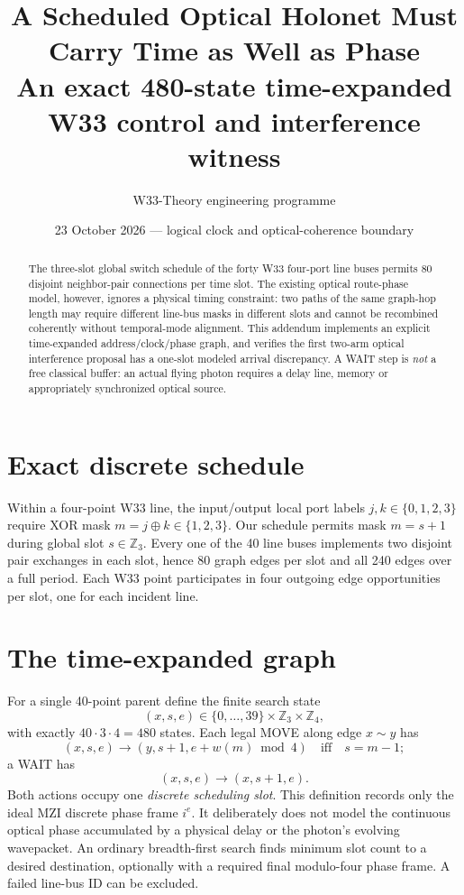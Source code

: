 \documentclass[10pt]{article}
\title{\textbf{A Scheduled Optical Holonet Must Carry Time as Well as Phase}\\
An exact 480-state time-expanded W33 control and interference witness}
\author{W33-Theory engineering programme}
\date{23 October 2026 --- logical clock and optical-coherence boundary}
\begin{document}
\maketitle
\begin{abstract}
The three-slot global switch schedule of the forty W33 four-port line buses
permits 80 disjoint neighbor-pair connections per time slot. The
existing optical route-phase model, however, ignores a physical timing
constraint: two paths of the same graph-hop length may require different
line-bus masks in different slots and cannot be recombined coherently
without temporal-mode alignment. This addendum implements an explicit
time-expanded address/clock/phase graph, and verifies the first
two-arm optical interference proposal has a one-slot modeled
arrival discrepancy. A WAIT step is \emph{not} a free classical
buffer: an actual flying photon requires a delay line, memory or
appropriately synchronized optical source.
\end{abstract}
\section{Exact discrete schedule}
Within a four-point W33 line, the input/output local port labels
$j,k\in\{0,1,2,3\}$ require XOR mask $m=j\oplus k\in\{1,2,3\}$.
Our schedule permits mask $m=s+1$ during global slot
$s\in\mathbb{Z}_3$. Every one of the 40 line buses
implements two disjoint pair exchanges in each slot, hence
80 graph edges per slot and all 240 edges over a full period.
Each W33 point participates in four outgoing edge
opportunities per slot, one for each incident line.
\section{The time-expanded graph}
For a single 40-point parent define the finite search state
\[
(x,s,e)\in \{0,\ldots,39\}\times\mathbb{Z}_3\times\mathbb{Z}_4,
\]
with exactly $40\cdot3\cdot4=480$ states.
Each legal MOVE along edge $x\sim y$ has
\[
(x,s,e)\longrightarrow(y,s+1,e+w(m)\bmod4)
\quad\text{iff}\quad s=m-1;
\]
a WAIT has
\[
(x,s,e)\longrightarrow(x,s+1,e).
\]
Both actions occupy one \emph{discrete scheduling slot}.
This definition records only the ideal MZI discrete
phase frame $i^e$. It deliberately does not model the
continuous optical phase accumulated by a physical
delay or the photon's evolving wavepacket.
An ordinary breadth-first search finds minimum slot count
to a desired destination, optionally with a required final
modulo-four phase frame. A failed line-bus ID can be excluded.
\end{document}
